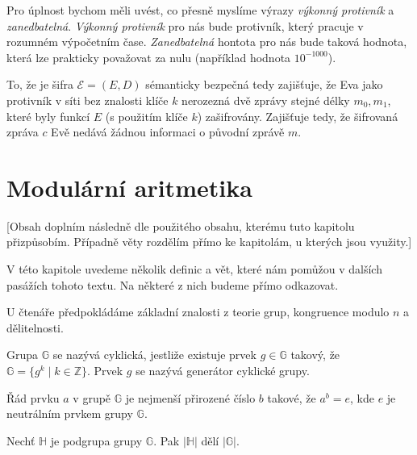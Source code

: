\documentclass[
  program=infoi,
  biblatex,
  figures=false,
  glossaries,
  index
]{kidiplom}
\begin{document}
        Pro úplnost bychom měli uvést, co přesně myslíme výrazy \emph{výkonný protivník} a \emph{zanedbatelná}.
        \emph{Výkonný protivník} pro nás bude protivník, který pracuje v rozumném výpočetním čase.
        \emph{Zanedbatelná} hontota pro nás bude taková hodnota, která lze prakticky považovat za nulu (například hodnota $10^{-1000}$).


        To, že je šifra $\mathcal{E}  = (E, D)$ sémanticky bezpečná tedy zajišťuje, že Eva jako protivník v síti
        bez znalosti klíče $k$ nerozezná dvě zprávy stejné délky $m_0, m_1$, které byly funkcí $E$ (s použitím klíče $k$) zašifrovány.
        Zajišťuje tedy, že šifrovaná zpráva $c$ Evě nedává žádnou informaci o původní zprávě $m$.


\section{Modulární aritmetika}\label{sec:modular-arithmetic}

    [Obsah doplním následně dle použitého obsahu, kterému tuto kapitolu přizpůsobím.
    Případně věty rozdělím přímo ke kapitolám, u kterých jsou využity.]

    \bigskip

    V této kapitole uvedeme několik definic a vět, které nám pomůžou v dalších pasážích tohoto textu.
    Na některé z nich budeme přímo odkazovat.
    
    U čtenáře předpokládáme základní znalosti z teorie grup, kongruence modulo $n$ a dělitelnosti.



    \begin{definition}
        Grupa $\mathbb{G}$ se nazývá cyklická, jestliže existuje prvek $g \in \mathbb{G}$ takový, že $\mathbb{G} =\{g^k \mid k \in \mathbb{Z}\}$.
        Prvek $g$ se nazývá generátor cyklické grupy.
    \end{definition}

    \begin{definition}
        Řád prvku $a$ v grupě $\mathbb{G}$ je nejmenší přirozené číslo $b$ takové, že $a^b = e$, kde $e$ je neutrálním prvkem grupy $\mathbb{G}$.
    \end{definition}


    \begin{theorem}
        
        Nechť $\mathbb{H}$ je podgrupa grupy $\mathbb{G}$. Pak $|\mathbb{H}|$ dělí $|\mathbb{G}|$.
    \end{theorem}
\end{document}
